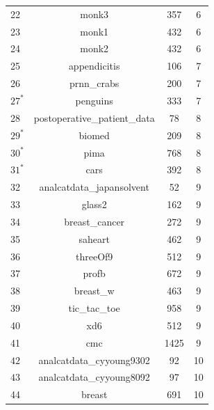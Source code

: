 \documentclass[a4paper,american,reqno]{amsart}
\begin{document}
\begin{center}
\begin{longtable}{l c c c }
    22                        &  monk3                        &  357   &  6 \\
    23                        &  monk1                        &  432   &  6 \\
    24                        &  monk2                        &  432   &  6 \\
    25                        &  appendicitis                 &  106   &  7  \\
    26                        &  prnn\_crabs                  &  200   &  7  \\
    $27^*$ &  penguins                     &  333   &  7  \\
    28 &  postoperative\_patient\_data &  78    &  8  \\
    $29^*$                        &  biomed                       &  209   &  8  \\
    $30^*$                        &  pima                         &  768   &  8  \\
    $31^*$                        &  cars                         &  392   &  8  \\
    32                        &  analcatdata\_japansolvent    &  52    &  9  \\
    33                        &  glass2                       &  162   &  9  \\
    34                        &  breast\_cancer               &  272   &  9  \\
    35                        &  saheart                      &  462   &  9  \\
    36                        &  threeOf9                     &  512   &  9 \\
    37                        &  profb                        &  672   &  9  \\
    38                        &  breast\_w                    &  463   &  9 \\
    39                        &  tic\_tac\_toe                &  958   &  9  \\
    40                        &  xd6                          &  512   &  9  \\
    41                        &  cmc                          &  1425  &  9  \\
    $42$ &  analcatdata\_cyyoung9302     &  92    &  10\\
    $43$ &  analcatdata\_cyyoung8092     &  97    &  10 \\
    44 &  breast                       &  691   &  10 \\

\end{longtable}
\end{center}
\end{document}
